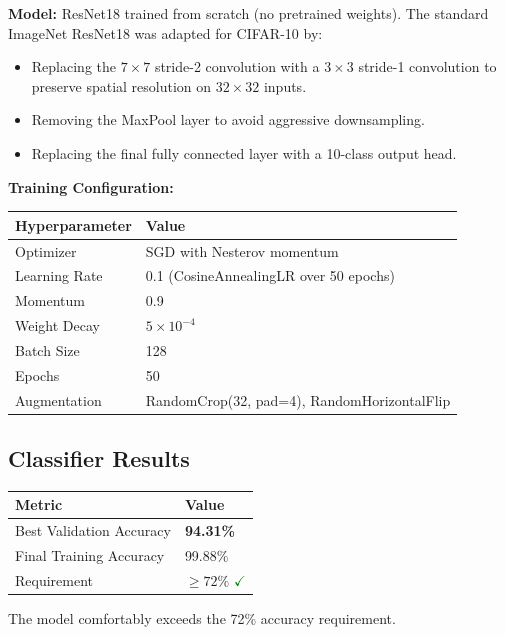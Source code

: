 \documentclass[12pt,a4paper]{article}
\begin{document}
\textbf{Model:} ResNet18 trained from scratch (no pretrained weights).
The standard ImageNet ResNet18 was adapted for CIFAR-10 by:
\begin{itemize}
    \item Replacing the $7\times7$ stride-2 convolution with a $3\times3$
    stride-1 convolution to preserve spatial resolution on $32\times32$ inputs.
    \item Removing the MaxPool layer to avoid aggressive downsampling.
    \item Replacing the final fully connected layer with a 10-class output head.
\end{itemize}

\textbf{Training Configuration:}
\begin{center}
\begin{tabular}{ll}
\toprule
\textbf{Hyperparameter} & \textbf{Value} \\
\midrule
Optimizer       & SGD with Nesterov momentum \\
Learning Rate   & 0.1 (CosineAnnealingLR over 50 epochs) \\
Momentum        & 0.9 \\
Weight Decay    & $5 \times 10^{-4}$ \\
Batch Size      & 128 \\
Epochs          & 50 \\
Augmentation    & RandomCrop(32, pad=4), RandomHorizontalFlip \\
\bottomrule
\end{tabular}
\end{center}

\subsection{Classifier Results}

\begin{center}
\begin{tabular}{ll}
\toprule
\textbf{Metric} & \textbf{Value} \\
\midrule
Best Validation Accuracy & \textbf{94.31\%} \\
Final Training Accuracy  & 99.88\% \\
Requirement              & $\geq 72\%$ \textcolor{green}{$\checkmark$} \\
\bottomrule
\end{tabular}
\end{center}

The model comfortably exceeds the 72\% accuracy requirement.
\end{document}
